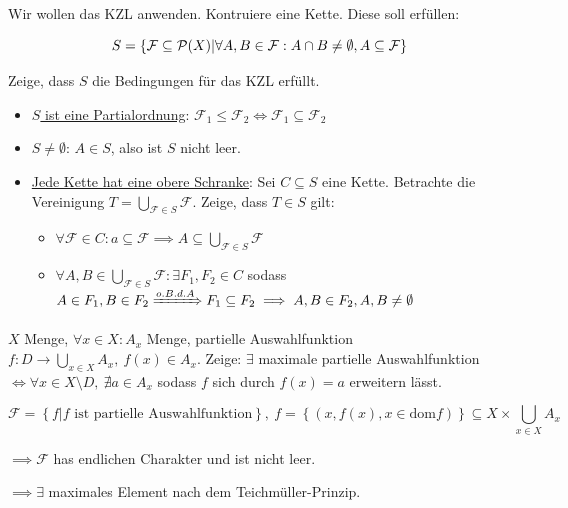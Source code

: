 \documentclass[12pt]{article}
\begin{document}
\begin{proofbox}
    Wir wollen das KZL anwenden. Kontruiere eine Kette. Diese soll erfüllen:

    $$
        S = \left\{\mathcal{F} \subseteq \mathcal{P}(X) | \forall A, B \in \mathcal{F} : A \cap B \neq \emptyset, A \subseteq \mathcal{F} \right\}
    $$

    Zeige, dass $S$ die Bedingungen für das KZL erfüllt.

    \begin{itemize}
        \item \underline{$S$ ist eine Partialordnung}: $\mathcal{F}_1 \leq \mathcal{F}_2 \iff \mathcal{F}_1 \subseteq \mathcal{F}_2$
        \item \underline{$S \neq \emptyset$}: $A \in S$, also ist $S$ nicht leer.
        \item \underline{Jede Kette hat eine obere Schranke}: Sei $C \subseteq S$ eine Kette. Betrachte die Vereinigung $T = \bigcup\limits_{\mathcal{F} \in S} \mathcal{F}$. Zeige, dass $T \in S$ gilt: 
        
        \begin{itemize}
            \item $\forall \mathcal{F} \in C : a \subseteq \mathcal{F} \implies A \subseteq \bigcup\limits_{\mathcal{F} \in S} \mathcal{F}$
            \item $\forall A, B \in \bigcup\limits_{\mathcal{F} \in S} \mathcal{F} : \exists F_1, F_2 \in C$ sodass $A \in F_1, B \in F_2 \xRightarrow{o.B.d.A} F_1 \subseteq F_2 \implies A, B \in F_2, A, B \neq \emptyset$
        \end{itemize}
    \end{itemize}
\end{proofbox}

\begin{exercise}{}{}
    $X$ Menge, $\forall x \in X : A_x$ Menge, partielle Auswahlfunktion $f: D \rightarrow \bigcup\limits_{x \in X} A_x, \ f(x) \in A_x$. Zeige: $\exists$ maximale partielle Auswahlfunktion $\iff \forall x \in X \setminus D, \ \nexists a \in A_x$ sodass $f$ sich durch $f(x) = a$ erweitern lässt.
\end{exercise}

\begin{proofbox}
    $$
        \mathcal{F} = \left\{f | f \text{ ist partielle Auswahlfunktion}\right\}, \ f = \left\{(x, f(x), x \in \mathrm{dom}f)\right\} \subseteq X \times \bigcup\limits_{x \in X} A_x
    $$

    $\implies \mathcal{F}$ has endlichen Charakter und ist nicht leer.

    $\implies \exists$ maximales Element nach dem Teichmüller-Prinzip.
\end{proofbox}
\end{document}

